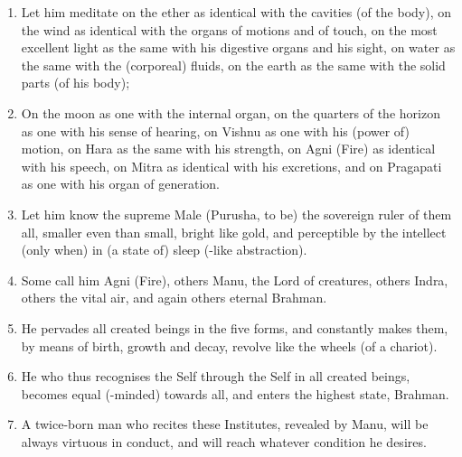 \begin{enumerate}
\item Let him meditate on the ether as identical with the cavities (of the body), on the wind as identical with the organs of motions and of touch, on the most excellent light as the same with his digestive organs and his sight, on water as the same with the (corporeal) fluids, on the earth as the same with the solid parts (of his body);
\item On the moon as one with the internal organ, on the quarters of the horizon as one with his sense of hearing, on Vishnu as one with his (power of) motion, on Hara as the same with his strength, on Agni (Fire) as identical with his speech, on Mitra as identical with his excretions, and on Pragapati as one with his organ of generation.
\item Let him know the supreme Male (Purusha, to be) the sovereign ruler of them all, smaller even than small, bright like gold, and perceptible by the intellect (only when) in (a state of) sleep (-like abstraction).
\item Some call him Agni (Fire), others Manu, the Lord of creatures, others Indra, others the vital air, and again others eternal Brahman.
\item He pervades all created beings in the five forms, and constantly makes them, by means of birth, growth and decay, revolve like the wheels (of a chariot).
\item He who thus recognises the Self through the Self in all created beings, becomes equal (-minded) towards all, and enters the highest state, Brahman.
\item A twice-born man who recites these Institutes, revealed by Manu, will be always virtuous in conduct, and will reach whatever condition he desires.
\end{enumerate}
